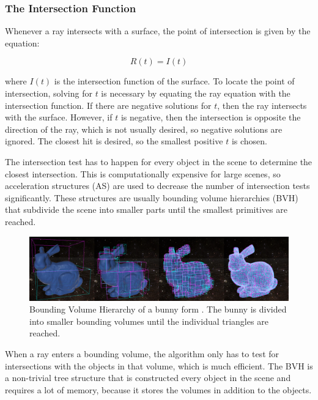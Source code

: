 \documentclass[12pt]{article}
\begin{document}
\subsubsection{The Intersection Function}

Whenever a ray intersects with a surface, the point of intersection is given by the equation:

\begin{equation}
    R(t) = I(t)
\end{equation}

where $I(t)$ is the intersection function of the surface. To locate the point of intersection,
solving for $t$ is necessary by equating the ray equation with the intersection function. 
If there are negative solutions for $t$, then the ray intersects with the surface. However, 
if $t$ is negative, then the intersection is opposite the direction of the ray, which is not usually desired,
so negative solutions are ignored. The closest hit is desired, so the smallest positive $t$ is chosen.

The intersection test has to happen for every object in the scene to determine the closest intersection.
This is computationally expensive for large scenes, so acceleration structures (AS) are used to decrease the number of intersection tests significantly.
These structures are usually bounding volume hierarchies (BVH) that subdivide the scene into smaller parts until the smallest primitives are reached.

\begin{figure}[h]
\includegraphics[scale=0.22]{BVH-Visualization}
\caption{Bounding Volume Hierarchy of a bunny form \parencite{Medium:BVH-Visualization}. The bunny is divided into smaller bounding volumes until the individual triangles are reached.}

\end{figure}

When a ray enters a bounding volume, the algorithm only has to test for intersections with the objects in that volume, which is much efficient.
The BVH is a non-trivial tree structure that is constructed every object in the scene and requires a lot of memory, because
it stores the volumes in addition to the objects.
\end{document}
